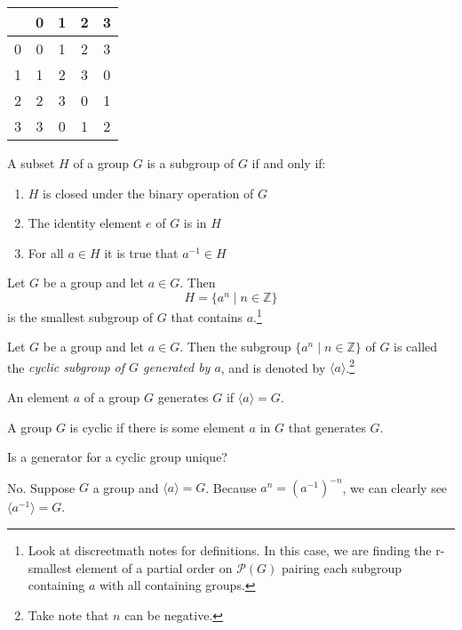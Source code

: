 \documentclass[nobib,notoc]{tufte-handout}
\begin{document}
\begin{defi}
	\;\medbreak
	\begin{tabular}{c||c|c|c|c}
		&0&1&2&3\\
		\hline\hline
		0&0&1&2&3\\
		\hline
		1&1&2&3&0\\
		\hline
		2&2&3&0&1\\
		\hline
		3&3&0&1&2\\
	\end{tabular}
\end{defi}
\begin{thm}
	A subset \(H\) of a group \(G\) is a subgroup of \(G\) if and only if:
	\begin{enumerate}
		\item \(H\) is closed under the binary operation of \(G\)
		\item The identity element \(e\) of \(G\) is in \(H\)
		\item For all \(a\in H\) it is true that \(a^{-1}\in H\)
	\end{enumerate}
\end{thm}
\begin{thm}
	Let \(G\) be a group and let \(a\in G\). Then
	\begin{equation*}
		H=\{a^n\mid n\in\mathbb{Z}\}
	\end{equation*}
	is the smallest subgroup of \(G\) that contains \(a\).\footnote{Look at discreetmath notes for definitions. In this case, we are finding the r-smallest element of a partial order on \(\mathscr{P}(G)\) pairing each subgroup containing \(a\) with all containing groups.}
\end{thm}
\begin{defi}
	Let \(G\) be a group and let \(a\in G\). Then the subgroup \(\{a^n\mid n\in\mathbb{Z}\}\) of \(G\) is called the \emph{cyclic subgroup of \(G\) generated by \(a\)}, and is denoted by \(\langle a\rangle\).\footnote{Take note that \(n\) can be negative.}
\end{defi}
\begin{defi}[Generator]
	An element \(a\) of a group \(G\) generates \(G\) if \(\langle a\rangle=G\).
\end{defi}
\begin{defi}
	A group \(G\) is cyclic if there is some element \(a\) in \(G\) that generates \(G\).
\end{defi}
\begin{prob}{3}
	Is a generator for a cyclic group unique?
	\begin{IEEEproof}
		No. Suppose \(G\) a group and \(\langle a\rangle=G\). Because \(a^n=(a^{-1})^{-n}\), we can clearly see \(\langle a^{-1}\rangle=G\).
	\end{IEEEproof}
\end{prob}
\end{document}
